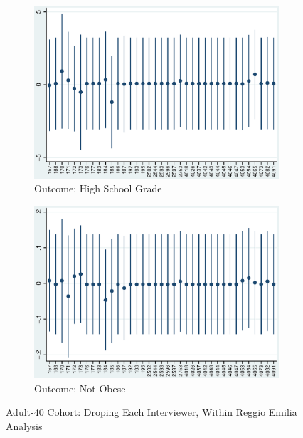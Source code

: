     \begin{figure}[H]
      \centering
        \begin{subfigure}[t]{0.75\textwidth}
          \includegraphics[width=\textwidth]{../../../output/image/coef-interviewer-adult40-votoMaturita.eps}       
\caption{Outcome: High School Grade}        
        \end{subfigure}
        \begin{subfigure}[t]{0.75\textwidth}
          \includegraphics[width=\textwidth]{../../../output/image/coef-interviewer-adult40-BMI_obese.eps}       
 \caption{Outcome: Not Obese}        
        \end{subfigure}
      \caption{Adult-40 Cohort: Droping Each Interviewer, Within Reggio Emilia Analysis}  \label{fig:adult40-sensitivity-interviewer}
    \end{figure}


